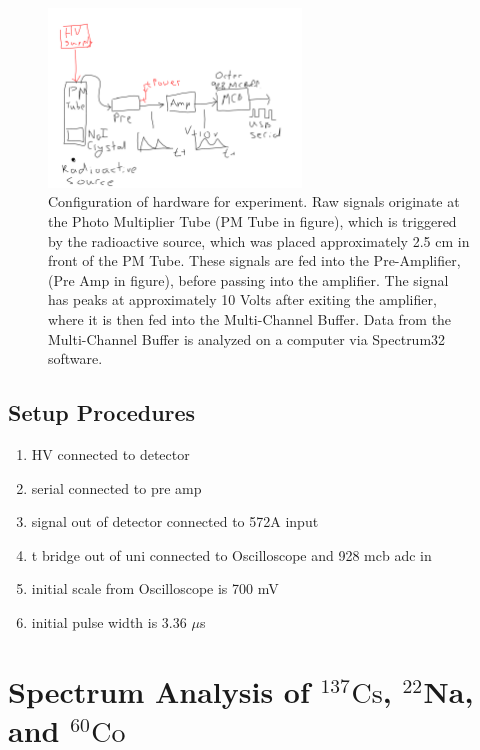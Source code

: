 \documentclass[a4paper]{article}
\begin{document}
\begin{figure}[H]
    \centering
    \includegraphics[width=0.6\textwidth]{figures/experiment-setup.pdf}
    \caption{Configuration of hardware for experiment. Raw signals originate at the Photo Multiplier Tube (PM Tube in figure), which is triggered by the radioactive source, which was placed approximately 2.5 cm in front of the PM Tube. These signals are fed into the Pre-Amplifier, (Pre Amp in figure), before passing into the amplifier. The signal has peaks at approximately 10 Volts after exiting the amplifier, where it is then fed into the Multi-Channel Buffer. Data from the Multi-Channel Buffer is analyzed on a computer via Spectrum32 software.}
    \label{fig:hardware-config}
\end{figure}

\subsection{Setup Procedures}

\begin{enumerate}
    \item HV connected to detector
    \item serial connected to pre amp
    \item signal out of detector connected to 572A input
    \item t bridge out of uni connected to Oscilloscope and 928 mcb adc in
    \item initial scale from Oscilloscope is 700 mV
    \item initial pulse width is 3.36 $\mu$s
\end{enumerate}

\section{Spectrum Analysis of $^{137}\mathrm{Cs}$, $^{22}\mathbf{Na}$, and $^{60}\mathrm{Co}$}
\end{document}
